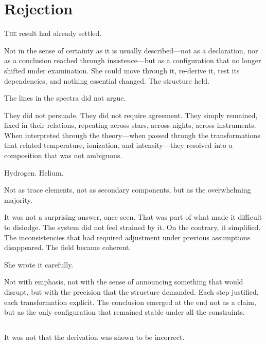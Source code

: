 
\chapter{Rejection}


\lettrine{T}{he} result had already settled.

Not in the sense of certainty as it is usually described---not as
a declaration, nor as a conclusion reached through insistence---but
as a configuration that no longer shifted under examination. She
could move through it, re-derive it, test its dependencies, and
nothing essential changed. The structure held.

The lines in the spectra did not argue.

They did not persuade. They did not require agreement. They simply
remained, fixed in their relations, repeating across stars, across
nights, across instruments. When interpreted through the
theory---when passed through the transformations that related
temperature, ionization, and intensity---they resolved into a
composition that was not ambiguous.

Hydrogen. Helium.

Not as trace elements, not as secondary components, but as the
overwhelming majority.

It was not a surprising answer, once seen. That was part of what
made it difficult to dislodge. The system did not feel strained by
it. On the contrary, it simplified. The inconsistencies that had
required adjustment under previous assumptions disappeared. The
field became coherent.

She wrote it carefully.

Not with emphasis, not with the sense of announcing something that
would disrupt, but with the precision that the structure demanded.
Each step justified, each transformation explicit. The conclusion
emerged at the end not as a claim, but as the only configuration
that remained stable under all the constraints.

\section{}

It was not that the derivation was shown to be incorrect.

